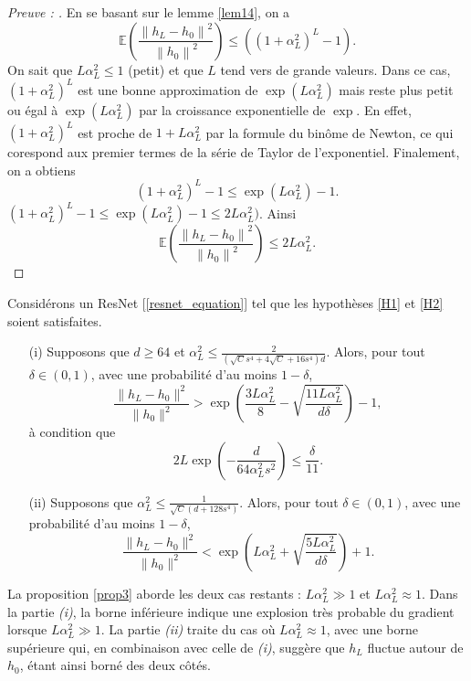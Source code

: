 \begin{proof}[Preuve : ]
    En se basant sur le lemme \ref{lem14}, on a 
    \[
        \mathbb{E}( \frac{\left\| h_L - h_0 \right\| ^2 }{\left\| h_0 \right\| ^2}) \leq ((1 + \alpha _L ^2 ) ^L - 1 )
    .\]
    On sait que $ L \alpha _L ^2 \leq 1 $ (petit) et que $ L $ tend vers de grande valeurs. Dans ce cas, $ (1 + \alpha _L ^2)^L $ est une bonne approximation de $ \exp (L \alpha _L ^2) $ mais reste plus petit ou égal à $ \exp (L \alpha _L ^2) $ par la croissance exponentielle de $ \exp  $. En effet, $ (1 + \alpha _L ^2)^L $ est proche de $ 1 + L \alpha _L ^2 $ par la formule du binôme de Newton, ce qui corespond aux premier termes de la série de Taylor de l'exponentiel. Finalement, on a obtiens
    \[
        (1 + \alpha _L ^2)^L -1 \leq \exp (L \alpha _L ^2) - 1
    .\]
    $ (1 + \alpha _L ^2)^L -1 \leq \exp (L \alpha _L ^2) - 1 \leq 2 L \alpha _L ^2) $. Ainsi 
    \[
        \mathbb{E}( \frac{\left\| h_L - h_0 \right\| ^2 }{\left\| h_0 \right\| ^2}) \leq 2 L \alpha _L ^2
    .\]
    
\end{proof}



\begin{proposition}[Admise]\label{prop3}
    Considérons un ResNet [\ref{resnet_equation}] tel que les hypothèses \ref{H1} et \ref{H2} soient satisfaites.
    \begin{itemize}
        \item[(i)] Supposons que $ d \geq 64 $ et $ \alpha _L ^2 \leq  \frac{2 }{(\sqrt{C } s^4 + 4 \sqrt{C } + 16 s ^4)d} $. Alors, pour tout $ \delta \in (0, 1) $, avec une probabilité d'au moins $ 1 - \delta $,
        \[
            \frac{\|h_L - h_0\|^2}{\|h_0\|^2} > \exp\left(\frac{3L\alpha_L^2}{8} - \sqrt{\frac{11L\alpha_L^2}{d\delta}}\right) - 1,
        \]
        à condition que
        \[
            2L \exp\left(-\frac{d}{64\alpha_L^2s^2}\right) \leq \frac{\delta}{11}.
        \]
        \item[(ii)] Supposons que $ \alpha_L^2 \leq \frac{1}{\sqrt{C}(d + 128s^4)} $. Alors, pour tout $ \delta \in (0, 1)$, avec une probabilité d'au moins $1 - \delta $,
        \[
            \frac{\|h_L - h_0\|^2}{\|h_0\|^2} < \exp\left(L\alpha_L^2 + \sqrt{\frac{5L\alpha_L^2}{d\delta}}\right) + 1.
        \]
    \end{itemize}
\end{proposition}
La proposition \ref{prop3} aborde les deux cas restants : $L \alpha_L^2 \gg 1$ et $L \alpha_L^2 \approx 1$. Dans la partie \textit{(i)}, la borne inférieure indique une explosion très probable du gradient lorsque $L \alpha_L^2 \gg 1$. La partie \textit{(ii)} traite du cas où $L \alpha_L^2 \approx 1$, avec une borne supérieure qui, en combinaison avec celle de \textit{(i)}, suggère que $h_L$ fluctue autour de $h_0$, étant ainsi borné des deux côtés.

